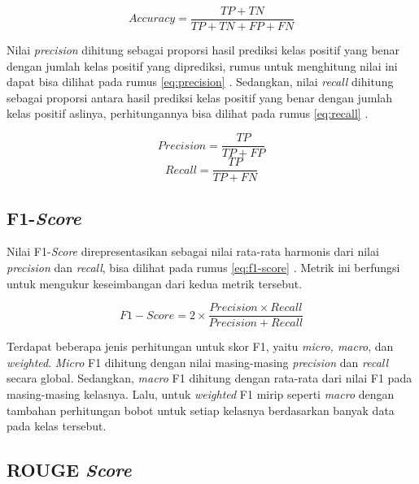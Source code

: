 \begin{equation}
    Accuracy = \frac{TP + TN}{TP + TN + FP + FN}
    \label{eq:accuracy}
\end{equation}

Nilai \textit{precision} dihitung sebagai proporsi hasil prediksi kelas positif yang benar dengan jumlah kelas positif yang diprediksi, rumus untuk menghitung nilai ini dapat bisa dilihat pada rumus \ref{eq:precision} \parencite{metrics}. Sedangkan, nilai \textit{recall} dihitung sebagai proporsi antara hasil prediksi kelas positif yang benar dengan jumlah kelas positif aslinya, perhitungannya bisa dilihat pada rumus \ref{eq:recall} \parencite{metrics}.

\begin{equation}
    Precision = \frac{TP}{TP + FP}
    \label{eq:precision}
\end{equation}
\begin{equation}
    Recall = \frac{TP}{TP + FN}
    \label{eq:recall}
\end{equation}

\subsection{F1-\textit{Score}}
Nilai F1-\textit{Score} direpresentasikan sebagai nilai rata-rata harmonis dari nilai \textit{precision} dan \textit{recall}, bisa dilihat pada rumus \ref{eq:f1-score} \parencite{metrics}. Metrik ini berfungsi untuk mengukur keseimbangan dari kedua metrik tersebut.

\begin{equation}
    F1-Score = 2 \times \frac{Precision \times Recall}{Precision + Recall}
    \label{eq:f1-score}
\end{equation}

Terdapat beberapa jenis perhitungan untuk skor F1, yaitu \textit{micro, macro}, dan \textit{weighted}. \textit{Micro} F1 dihitung dengan nilai masing-masing \textit{precision} dan \textit{recall} secara global. Sedangkan, \textit{macro} F1 dihitung dengan rata-rata dari nilai F1 pada masing-masing kelasnya. Lalu, untuk \textit{weighted} F1 mirip seperti \textit{macro} dengan tambahan perhitungan bobot untuk setiap kelasnya berdasarkan banyak data pada kelas tersebut.

\subsection{ROUGE \textit{Score}}

